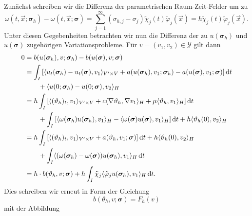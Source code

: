 \begin{Satz}
\begin{Beweis}
        Zunächst schreiben wir die Differenz der parametrischen Raum-Zeit-Felder um zu
        \begin{equation}
            \omega(t, \vec{x}; \bm\sigma_{h}) - \omega(t, \vec{x}; \bm\sigma)
            = \sum_{j = 1}^{\infty} (\sigma_{h,j} - \sigma_{j} ) \tilde{\chi}_{j}(t) \tilde{\varphi}_{j}(\vec{x})
            = h \tilde{\chi}_{j}(t) \tilde{\varphi}_{j}(\vec{x}).
        \end{equation}
        Unter diesen Gegebenheiten betrachten wir nun die Differenz der zu $u(\bm\sigma_{h})$ und $u(\bm\sigma)$ zugehörigen Variationsprobleme.
        Für $v = (v_{1}, v_{2}) \in \mathcal Y$ gilt dann
        \begin{align}
            0
            &= b(u(\bm\sigma_{h}), v; \bm\sigma_{h}) - b(u(\bm\sigma), v; \bm\sigma)
            \\&= \int_{I} \left[ \langle u_{t}(\bm\sigma_{h}) - u_{t}(\bm\sigma),v_{1}\rangle_{V' \times V} + a(u(\bm\sigma_{h}), v_{1}; \bm\sigma_{h}) - a(u(\bm\sigma), v_{1}; \bm\sigma) \right] \mathop{}\!\mathrm{d} t
            \\&\qquad + \langle u(0; \bm\sigma_{h}) - u(0; \bm\sigma),v_{2}\rangle_{H}
            \\&=  h \int_{I} \left[ \langle(\vartheta_{h})_{t},v_{1}\rangle_{V' \times V} + c\langle\nabla \vartheta_{h},\nabla v_{1}\rangle_{H}  +  \mu \langle\vartheta_{h},v_{1}\rangle_{H} \right] \mathop{}\!\mathrm{d} t
            \\&\qquad + \int_{I} \left[ \langle\omega(\bm\sigma_{h}) u(\bm\sigma_{h}),v_{1}\rangle_{H} - \langle\omega(\bm\sigma) u(\bm\sigma),v_{1}\rangle_{H}  \right] \mathop{}\!\mathrm{d} t + h \langle\vartheta_{h}(0),v_{2}\rangle_{H}
            \\&= h \int_{I} \left[ \langle(\vartheta_{h})_{t},v_{1}\rangle_{V' \times V} + a(\vartheta_{h}, v_{1}; \bm\sigma)  \right] \mathop{}\!\mathrm{d} t + h \langle\vartheta_{h}(0),v_{2}\rangle_{H}
            \\&\qquad +\int_{I} \langle(\omega(\bm\sigma_{h}) - \omega(\bm\sigma))u(\bm\sigma_{h}),v_{1}\rangle_{H} \mathop{}\!\mathrm{d} t
            \\&= h \cdot b(\vartheta_{h}, v; \bm\sigma) + h \int_{I} \tilde{\chi}_{j} \langle\tilde{\varphi}_{j} u(\bm\sigma_{h}),v_{1}\rangle_{H} \mathop{}\!\mathrm{d} t.
        \end{align}
        Dies schreiben wir erneut in Form der Gleichung
        \begin{equation}
            \label{eq:existenz_partieller_ableitungen:beweis:variationsproblem}
            b(\theta_{h}, v; \bm\sigma) = F_{h}(v)
        \end{equation}
        mit der Abbildung
        \begin{equation}

\end{equation}
\end{Beweis}
\end{Satz}
